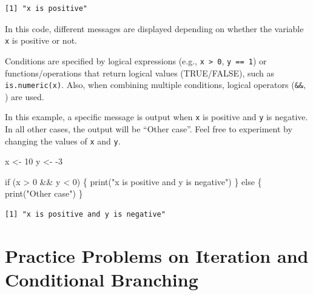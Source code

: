 \documentclass[
  a4paper,
]{book}
\newenvironment{Shaded}{\begin{snugshade}}{\end{snugshade}}
\newcommand{\ControlFlowTok}[1]{\textcolor[rgb]{0.00,0.23,0.31}{#1}}
\newcommand{\DecValTok}[1]{\textcolor[rgb]{0.68,0.00,0.00}{#1}}
\newcommand{\FunctionTok}[1]{\textcolor[rgb]{0.28,0.35,0.67}{#1}}
\newcommand{\NormalTok}[1]{\textcolor[rgb]{0.00,0.23,0.31}{#1}}
\newcommand{\OtherTok}[1]{\textcolor[rgb]{0.00,0.23,0.31}{#1}}
\newcommand{\SpecialCharTok}[1]{\textcolor[rgb]{0.37,0.37,0.37}{#1}}
\newcommand{\StringTok}[1]{\textcolor[rgb]{0.13,0.47,0.30}{#1}}
\begin{document}
\begin{verbatim}
[1] "x is positive"
\end{verbatim}

In this code, different messages are displayed depending on whether the
variable \texttt{x} is positive or not.

Conditions are specified by logical expressions (e.g.,
\texttt{x\ \textgreater{}\ 0}, \texttt{y\ ==\ 1}) or
functions/operations that return logical values (TRUE/FALSE), such as
\texttt{is.numeric(x)}. Also, when combining multiple conditions,
logical operators (\texttt{\&\&}, \texttt{\textbar{}\textbar{}}) are
used.

In this example, a specific message is output when \texttt{x} is
positive and \texttt{y} is negative. In all other cases, the output will
be ``Other case''. Feel free to experiment by changing the values of
\texttt{x} and \texttt{y}.

\begin{Shaded}
\begin{Highlighting}[]
\NormalTok{x }\OtherTok{\textless{}{-}} \DecValTok{10}
\NormalTok{y }\OtherTok{\textless{}{-}} \SpecialCharTok{{-}}\DecValTok{3}

\ControlFlowTok{if}\NormalTok{ (x }\SpecialCharTok{\textgreater{}} \DecValTok{0} \SpecialCharTok{\&\&}\NormalTok{ y }\SpecialCharTok{\textless{}} \DecValTok{0}\NormalTok{) \{}
  \FunctionTok{print}\NormalTok{(}\StringTok{"x is positive and y is negative"}\NormalTok{)}
\NormalTok{\} }\ControlFlowTok{else}\NormalTok{ \{}
  \FunctionTok{print}\NormalTok{(}\StringTok{"Other case"}\NormalTok{)}
\NormalTok{\}}
\end{Highlighting}
\end{Shaded}

\begin{verbatim}
[1] "x is positive and y is negative"
\end{verbatim}

\section{Practice Problems on Iteration and Conditional
Branching}\label{practice-problems-on-iteration-and-conditional-branching}
\end{document}
